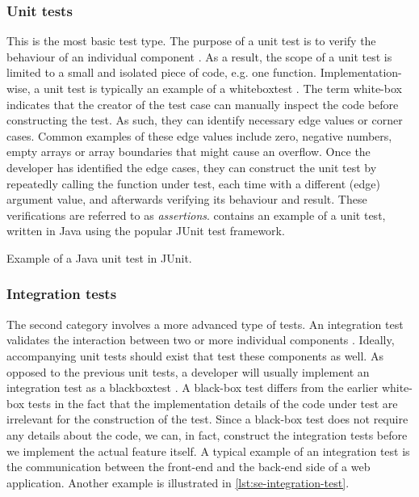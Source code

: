 \subsubsection{Unit tests}
This is the most basic test type. The purpose of a unit test is to verify the behaviour of an individual component \cite{whittaker2000}. As a result, the scope of a unit test is limited to a small and isolated piece of code, e.g. one function. Implementation-wise, a unit test is typically an example of a \gls{whiteboxtest} \cite[p.~12]{6588537}. The term white-box indicates that the creator of the test case can manually inspect the code before constructing the test. As such, they can identify necessary edge values or corner cases. Common examples of these edge values include zero, negative numbers, empty arrays or array boundaries that might cause an overflow. Once the developer has identified the edge cases, they can construct the unit test by repeatedly calling the function under test, each time with a different (edge) argument value, and afterwards verifying its behaviour and result. These verifications are referred to as \emph{assertions}.  contains an example of a unit test, written in Java using the popular JUnit test framework.
	
\begin{listing}
	
	\caption{Example of a Java unit test in JUnit.}
	\label{lst:se-unit-test}
\end{listing}

\subsubsection{Integration tests}
The second category involves a more advanced type of tests. An integration test validates the interaction between two or more individual components \cite{whittaker2000}. Ideally, accompanying unit tests should exist that test these components as well. As opposed to the previous unit tests, a developer will usually implement an integration test as a \gls{blackboxtest} \cite[p.~6]{6588537}. A black-box test differs from the earlier white-box tests in the fact that the implementation details of the code under test are irrelevant for the construction of the test. Since a black-box test does not require any details about the code, we can, in fact, construct the integration tests before we implement the actual feature itself. A typical example of an integration test is the communication between the front-end and the back-end side of a web application. Another example is illustrated in \cref{lst:se-integration-test}.
	
